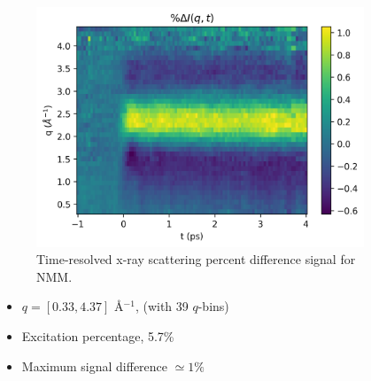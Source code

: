 \documentclass{beamer}
\begin{document}
\begin{frame}
	\begin{columns} 
		\begin{column}{.4\textwidth}
	\begin{figure}[H]
	\centering
	\includegraphics[width=\textwidth]{NMM_exp_2Dplot.png}
	\caption{Time-resolved x-ray scattering percent difference signal for NMM.}
	\label{fig:nmm-2dplot}
\end{figure}
\vspace{-5mm}
\begin{itemize}
	\item $q = [0.33, 4.37] $ \AA$^{-1}$, (with 39 $q$-bins)
	\item Excitation percentage, 5.7\%
	\item Maximum signal difference $\simeq 1\%$
\end{itemize}
		\end{column}
		\begin{column}{.6\textwidth}
			\begin{figure}[H]
				\centering

\end{figure}
\end{column}
\end{columns}
\end{frame}
\end{document}
